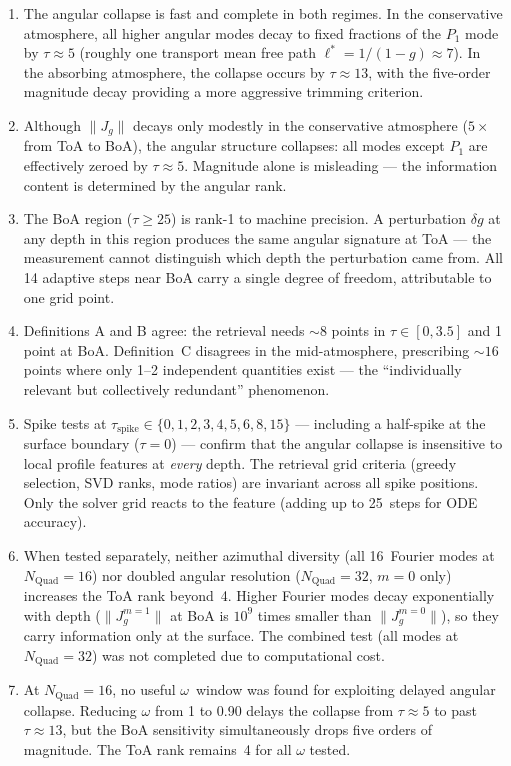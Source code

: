 \documentclass[11pt]{article}
\newcommand{\norm}[1]{\lVert #1 \rVert}
\begin{document}
\begin{enumerate}
\item The angular collapse is fast and complete in both regimes.
  In the conservative atmosphere, all higher angular modes
  decay to fixed fractions of the $P_1$ mode by
  $\tau\approx 5$ (roughly one transport mean free path
  $\ell^* = 1/(1-g) \approx 7$).
  In the absorbing atmosphere, the collapse occurs by
  $\tau\approx 13$, with the five-order magnitude decay
  providing a more aggressive trimming criterion.

\item Although $\norm{J_g}$ decays only modestly in the conservative
  atmosphere ($5\times$ from ToA to BoA), the angular structure
  collapses: all modes except $P_1$ are effectively zeroed by
  $\tau\approx 5$.  Magnitude alone is misleading --- the
  information content is determined by the angular rank.

\item The BoA region ($\tau\geq25$) is rank-1 to machine
  precision.  A perturbation $\delta g$ at any depth in this
  region produces the same angular signature at ToA --- the
  measurement cannot distinguish which depth the perturbation
  came from.  All 14 adaptive steps near BoA carry a single
  degree of freedom, attributable to one grid point.

\item Definitions A and B agree: the retrieval needs ${\sim}8$
  points in $\tau\in[0,3.5]$ and 1 point at BoA.  Definition~C
  disagrees in the mid-atmosphere, prescribing ${\sim}16$ points
  where only 1--2 independent quantities exist --- the
  ``individually relevant but collectively redundant'' phenomenon.

\item Spike tests at $\tau_\mathrm{spike}\in\{0,1,2,3,4,5,6,8,15\}$
  --- including a half-spike at the surface boundary ($\tau=0$) ---
  confirm that the angular collapse is insensitive to local
  profile features at \emph{every} depth.  The retrieval grid
  criteria (greedy selection, SVD ranks, mode ratios) are invariant
  across all spike positions.  Only the solver grid reacts to the
  feature (adding up to 25~steps for ODE accuracy).

\item When tested separately, neither azimuthal diversity
  (all 16~Fourier modes at $N_\mathrm{Quad}=16$) nor doubled
  angular resolution ($N_\mathrm{Quad}=32$, $m=0$ only) increases
  the ToA rank beyond~4.  Higher Fourier modes decay exponentially
  with depth ($\norm{J_g^{m=1}}$ at BoA is $10^{9}$ times smaller
  than $\norm{J_g^{m=0}}$), so they carry information only at the
  surface.  The combined test (all modes at $N_\mathrm{Quad}=32$)
  was not completed due to computational cost.

\item At $N_\mathrm{Quad}=16$, no useful $\omega$~window was found
  for exploiting delayed angular collapse.  Reducing $\omega$ from
  1 to 0.90 delays the collapse from $\tau\approx 5$ to past
  $\tau\approx 13$, but the BoA sensitivity simultaneously drops
  five orders of magnitude.  The ToA rank remains~4 for all
  $\omega$ tested.
\end{enumerate}
\end{document}
